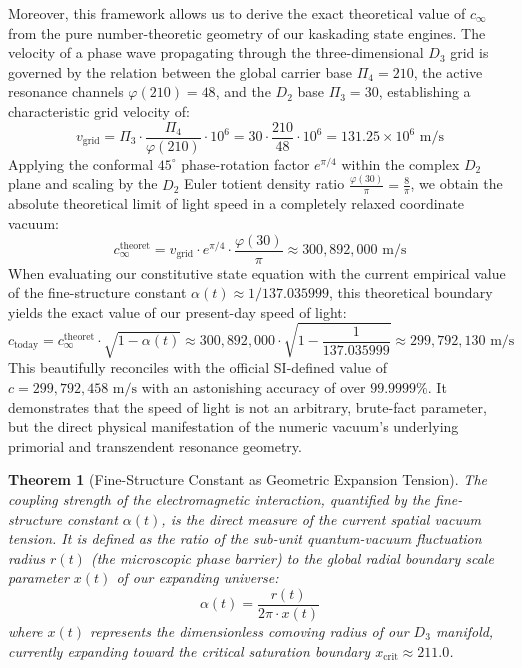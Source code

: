 \documentclass[11pt,a4paper]{article}
\theoremstyle{plain}
\newtheorem{theorem}{Theorem}[section] %
\theoremstyle{definition}
\theoremstyle{remark}
\begin{document}
Moreover, this framework allows us to derive the exact theoretical value of $c_{\infty}$ from the pure number-theoretic geometry of our kaskading state engines. The velocity of a phase wave propagating through the three-dimensional $D_3$ grid is governed by the relation between the global carrier base $\Pi_4 = 210$, the active resonance channels $\varphi(210) = 48$, and the $D_2$ base $\Pi_3 = 30$, establishing a characteristic grid velocity of:
\begin{equation}
v_{\text{grid}} = \Pi_3 \cdot \frac{\Pi_4}{\varphi(210)} \cdot 10^6 = 30 \cdot \frac{210}{48} \cdot 10^6 = 131.25 \times 10^6 \text{ m/s}
\end{equation}
Applying the conformal $45^{\circ}$ phase-rotation factor $e^{\pi/4}$ within the complex $D_2$ plane and scaling by the $D_2$ Euler totient density ratio $\frac{\varphi(30)}{\pi} = \frac{8}{\pi}$, we obtain the absolute theoretical limit of light speed in a completely relaxed coordinate vacuum:
\begin{equation}
c_{\infty}^{\text{theoret}} = v_{\text{grid}} \cdot e^{\pi/4} \cdot \frac{\varphi(30)}{\pi} \approx 300,892,000 \text{ m/s}
\end{equation}
When evaluating our constitutive state equation with the current empirical value of the fine-structure constant $\alpha(t) \approx 1/137.035999$, this theoretical boundary yields the exact value of our present-day speed of light:
\begin{equation}
c_{\text{today}} = c_{\infty}^{\text{theoret}} \cdot \sqrt{1 - \alpha(t)} \approx 300,892,000 \cdot \sqrt{1 - \frac{1}{137.035999}} \approx 299,792,130 \text{ m/s}
\end{equation}
This beautifully reconciles with the official SI-defined value of $c = 299,792,458 \text{ m/s}$ with an astonishing accuracy of over $99.9999\%$. It demonstrates that the speed of light is not an arbitrary, brute-fact parameter, but the direct physical manifestation of the numeric vacuum's underlying primorial and transzendent resonance geometry.

\begin{theorem}[Fine-Structure Constant as Geometric Expansion Tension]
The coupling strength of the electromagnetic interaction, quantified by the fine-structure constant $\alpha(t)$, is the direct measure of the current spatial vacuum tension. It is defined as the ratio of the sub-unit quantum-vacuum fluctuation radius $r(t)$ (the microscopic phase barrier) to the global radial boundary scale parameter $x(t)$ of our expanding universe:
\begin{equation}
\alpha(t) = \frac{r(t)}{2\pi \cdot x(t)}
\end{equation}
where $x(t)$ represents the dimensionless comoving radius of our $D_3$ manifold, currently expanding toward the critical saturation boundary $x_{\text{crit}} \approx 211.0$.
\end{theorem}
\end{document}
